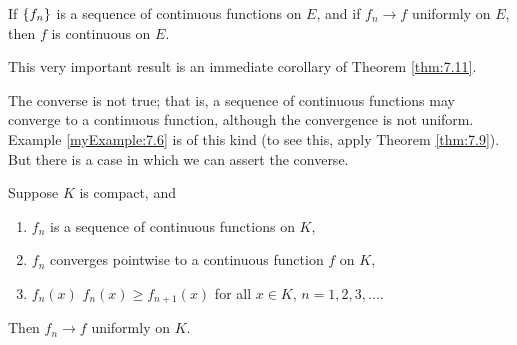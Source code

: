 
\begin{thm}
    \label{thm:7.12}
    If $\protect\{f_n\}$ is a sequence of continuous functions on $E$, 
    and if $f_n \rightarrow f$ 
    uniformly on $E$, then $f$ is continuous on $E$.
\end{thm}

This very important result is an immediate corollary of Theorem \ref{thm:7.11}.

The converse is not true; 
that is, a sequence of continuous functions may converge to a continuous function, although the convergence is not uniform.
Example \ref{myExample:7.6} is of this kind 
(to see this, apply Theorem \ref{thm:7.9}). 
But there is a case in which we can assert the converse.

\begin{thm}
    \label{thm:7.13}
    Suppose $K$ is compact, and
    \begin{enumerate}
        \item ${f_n}$ is a sequence of continuous functions on $K$,
        \item ${f_n}$ converges pointwise to a continuous function $f$ on $K$,
        \item $f_n(x)$ $f_n(x) \geq f_{n+1}(x)$ for all $x \in K$, $n = 1, 2, 3, ...$.
    \end{enumerate}
    Then $f_n \rightarrow f$ uniformly on $K$.
\end{thm}

